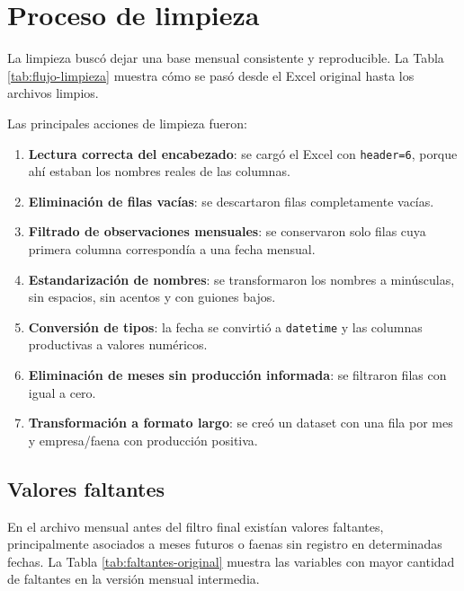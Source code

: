 \documentclass[11pt,letterpaper]{article}
\newcommand{\code}[1]{\texttt{\detokenize{#1}}}
\begin{document}
\section{Proceso de limpieza}

La limpieza buscó dejar una base mensual consistente y reproducible. La Tabla \ref{tab:flujo-limpieza} muestra cómo se pasó desde el Excel original hasta los archivos limpios.

\begin{table}[H]
\centering
\caption{Flujo de limpieza aplicado al dataset}
\label{tab:flujo-limpieza}

\end{table}

Las principales acciones de limpieza fueron:

\begin{enumerate}[itemsep=0.2em]
    \item \textbf{Lectura correcta del encabezado}: se cargó el Excel con \texttt{header=6}, porque ahí estaban los nombres reales de las columnas.
    \item \textbf{Eliminación de filas vacías}: se descartaron filas completamente vacías.
    \item \textbf{Filtrado de observaciones mensuales}: se conservaron solo filas cuya primera columna correspondía a una fecha mensual.
    \item \textbf{Estandarización de nombres}: se transformaron los nombres a minúsculas, sin espacios, sin acentos y con guiones bajos.
    \item \textbf{Conversión de tipos}: la fecha se convirtió a \texttt{datetime} y las columnas productivas a valores numéricos.
    \item \textbf{Eliminación de meses sin producción informada}: se filtraron filas con \code{total_chile} igual a cero.
    \item \textbf{Transformación a formato largo}: se creó un dataset con una fila por mes y empresa/faena con producción positiva.
\end{enumerate}

\subsection{Valores faltantes}

En el archivo mensual antes del filtro final existían valores faltantes, principalmente asociados a meses futuros o faenas sin registro en determinadas fechas. La Tabla \ref{tab:faltantes-original} muestra las variables con mayor cantidad de faltantes en la versión mensual intermedia.
\end{document}
